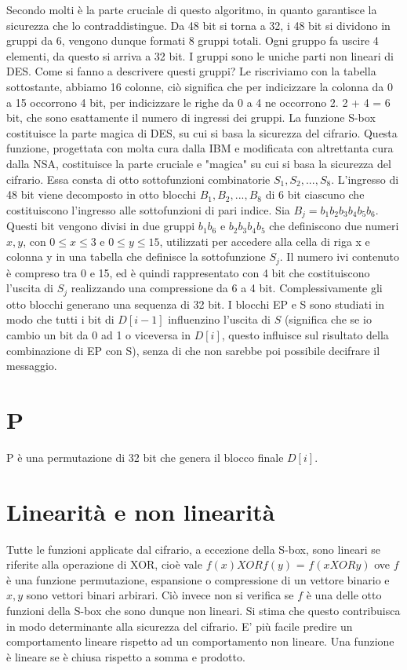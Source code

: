 Secondo molti è la parte cruciale di questo algoritmo, in quanto garantisce la sicurezza che lo contraddistingue. Da 48 bit si torna a 32, i 48 bit si dividono in gruppi da 6, vengono dunque formati 8 gruppi totali. Ogni gruppo fa uscire 4 elementi, da questo si arriva a 32 bit. I gruppi sono le uniche parti non lineari di DES. Come si fanno a descrivere questi gruppi? Le riscriviamo con la tabella sottostante, abbiamo 16 colonne, ciò significa che per indicizzare la colonna da 0 a 15 occorrono 4 bit, per indicizzare le righe da 0 a 4 ne occorrono 2. 2 + 4 = 6 bit, che sono esattamente il numero di ingressi dei gruppi. La funzione S-box costituisce la parte magica di DES, su cui si basa la sicurezza del cifrario. Questa funzione, progettata con molta cura dalla IBM e modificata con altrettanta cura dalla NSA, costituisce la
parte cruciale e "magica" su cui si basa la sicurezza del cifrario. Essa consta di otto sottofunzioni combinatorie $S_1, S_2, ..., S_8$. L’ingresso di 48 bit viene decomposto in otto blocchi $B_1, B_2, ..., B_8$ di 6 bit ciascuno che costituiscono l’ingresso alle sottofunzioni di pari indice.
Sia $B_j = b_1b_2b_3b_4b_5b_6$. Questi bit vengono divisi in due
gruppi $b_1b_6$  e  $b_2b_3b_4b_5$ che definiscono due numeri $x, y$,
con $0 \leq x \leq 3 $ e $0 \leq y \leq 15$, utilizzati per accedere alla
cella di riga x e colonna y in una tabella che definisce la
sottofunzione $S_j$. Il numero ivi contenuto è compreso tra 0
e 15, ed è quindi rappresentato con 4 bit che costituiscono
l’uscita di $S_j$ realizzando una compressione da 6 a 4 bit. Complessivamente gli otto blocchi generano una sequenza
di 32 bit. I blocchi EP e S sono studiati in modo che
tutti i bit di $D[i - 1]$ influenzino l’uscita di $S$ (significa che se io cambio un bit da 0 ad 1 o viceversa in $D[i]$, questo influisce sul risultato della combinazione di EP con S), senza di
che non sarebbe poi possibile decifrare il messaggio.

\section{P}

P è una permutazione di 32 bit che genera il blocco finale $D[i]$.

\section{Linearità e non linearità}

Tutte le funzioni applicate dal cifrario, a eccezione della
S-box, sono lineari se riferite alla operazione di XOR,
cioè vale $f(x) XOR f (y)$ = $f (x XOR y)$ ove $f$ è una funzione
permutazione, espansione o compressione di un vettore
binario e $x, y$ sono vettori binari arbirari. Ciò invece non
si verifica se $f$ è una delle otto funzioni della S-box che
sono dunque non lineari. Si stima che questo contribuisca
in modo determinante alla sicurezza del cifrario. E' più facile predire un comportamento lineare rispetto ad un comportamento non lineare. Una funzione è lineare se è chiusa rispetto a somma e prodotto.

